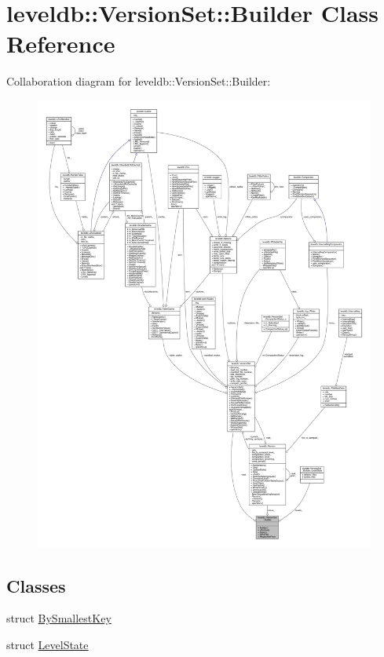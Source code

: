 \hypertarget{classleveldb_1_1_version_set_1_1_builder}{}\section{leveldb\+:\+:Version\+Set\+:\+:Builder Class Reference}
\label{classleveldb_1_1_version_set_1_1_builder}


Collaboration diagram for leveldb\+:\+:Version\+Set\+:\+:Builder\+:
\nopagebreak
\begin{figure}[H]
\begin{center}
\leavevmode
\includegraphics[width=350pt]{classleveldb_1_1_version_set_1_1_builder__coll__graph}
\end{center}
\end{figure}
\subsection*{Classes}
\begin{DoxyCompactItemize}
\item 
struct \hyperlink{structleveldb_1_1_version_set_1_1_builder_1_1_by_smallest_key}{By\+Smallest\+Key}
\item 
struct \hyperlink{structleveldb_1_1_version_set_1_1_builder_1_1_level_state}{Level\+State}
\end{DoxyCompactItemize}
